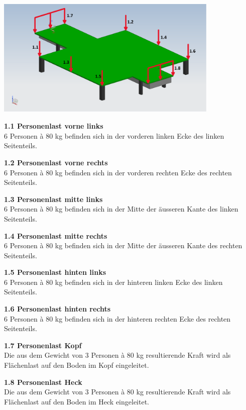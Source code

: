 \begin{center}
  \includegraphics[width=0.8\textwidth]{04_Figures/BodenMitLasten.png}
  \label{Boden}
\end{center}

\begin{description}
  \item \textbf{1.1 Personenlast vorne links}\\
  6 Personen à 80 kg befinden sich in der vorderen linken Ecke des linken Seitenteils.
  \item \textbf{1.2 Personenlast vorne rechts}\\
  6 Personen à 80 kg befinden sich in der vorderen rechten Ecke des rechten Seitenteils.
  \item \textbf{1.3 Personenlast mitte links}\\
  6 Personen à 80 kg befinden sich in der Mitte der äusseren Kante des linken Seitenteils.
  \item \textbf{1.4 Personenlast mitte rechts}\\
  6 Personen à 80 kg befinden sich in der Mitte der äusseren Kante des rechten Seitenteils.
  \item \textbf{1.5 Personenlast hinten links}\\
  6 Personen à 80 kg befinden sich in der hinteren linken Ecke des linken Seitenteils.
  \item \textbf{1.6 Personenlast hinten rechts}\\
  6 Personen à 80 kg befinden sich in der hinteren rechten Ecke des rechten Seitenteils.
  \item \textbf{1.7 Personenlast Kopf}\\
  Die aus dem Gewicht von 3 Personen à 80 kg resultierende Kraft wird als Flächenlast auf den Boden im Kopf eingeleitet.
  \item \textbf{1.8 Personenlast Heck}\\
  Die aus dem Gewicht von 3 Personen à 80 kg resultierende Kraft wird als Flächenlast auf den Boden im Heck eingeleitet.
\end{description}

